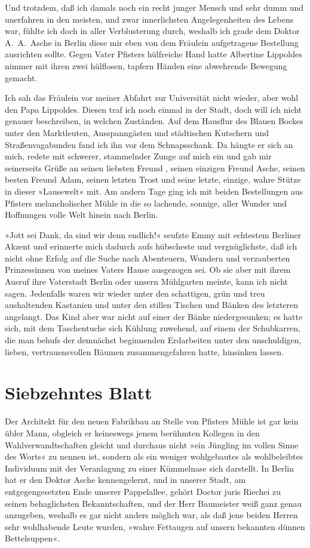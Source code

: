 Und trotzdem, daß ich damals noch ein recht junger Mensch und sehr
dumm und unerfahren in den meisten, und zwar innerlichsten
Angelegenheiten des Lebens war, fühlte ich doch in aller
Verblusterung durch, weshalb ich grade dem Doktor A.~A.~Asche in
Berlin diese mir eben von dem Fräulein aufgetragene Bestellung
ausrichten sollte. Gegen Vater Pfisters hülfreiche Hand hatte
Albertine Lippoldes nimmer mit ihren zwei hülflosen, tapfern Händen
eine abwehrende Bewegung gemacht.

Ich sah das Fräulein vor meiner Abfahrt zur Universität nicht
wieder, aber wohl den Papa Lippoldes. Diesen traf ich noch einmal
in der Stadt, doch will ich nicht genauer beschreiben, in welchen
Zuständen. Auf dem Hausflur des Blauen Bockes unter den
Marktleuten, Ausspanngästen und städtischen Kutschern und
Straßenvagabunden fand ich ihn vor dem Schnapsschank. Da hängte er
sich an mich, redete mit schwerer, stammelnder Zunge auf mich ein
und gab mir seinerseits Grüße an seinen liebsten Freund , seinen
einzigen Freund Asche, seinen besten Freund Adam, seinen letzten
Trost und seine letzte, einzige, wahre Stütze in dieser »Lausewelt«
mit. Am andern Tage ging ich mit beiden Bestellungen aus Pfisters
melancholischer Mühle in die so lachende, sonnige, aller Wunder und
Hoffnungen volle Welt hinein nach Berlin.

»Jott sei Dank, da sind wir denn endlich!« seufzte Emmy mit
echtestem Berliner Akzent und erinnerte mich dadurch aufs
hübscheste und vergnüglichste, daß ich nicht ohne Erfolg auf die
Suche nach Abenteuern, Wundern und verzauberten Prinzessinnen von
meines Vaters Hause ausgezogen sei. Ob sie aber mit ihrem Ausruf
ihre Vaterstadt Berlin oder unsern Mühlgarten meinte, kann ich
nicht sagen. Jedenfalls waren wir wieder unter den schattigen, grün
und treu aushaltenden Kastanien und unter den stillen Tischen und
Bänken des letzteren angelangt. Das Kind aber war nicht auf einer
der Bänke niedergesunken; es hatte sich, mit dem Taschentuche sich
Kühlung zuwehend, auf einem der Schubkarren, die man behufs der
demnächst beginnenden Erdarbeiten unter den unschuldigen, lieben,
vertrauensvollen Bäumen zusammengefahren hatte, hinsinken lassen.

\section{Siebzehntes Blatt}

Der Architekt für den neuen Fabrikbau an Stelle von Pfisters Mühle
ist gar kein übler Mann, obgleich er keineswegs jenem berühmten
Kollegen in den Wahlverwandtschaften gleicht und durchaus nicht
»ein Jüngling im vollen Sinne des Worts« zu nennen ist, sondern als
ein weniger wohlgebautes als wohlbeleibtes Individuum mit der
Veranlagung zu einer Kümmelnase sich darstellt. In Berlin hat er
den Doktor Asche kennengelernt, und in unserer Stadt, am
entgegengesetzten Ende unserer Pappelallee, gehört Doctor juris
Riechei zu seinen behaglichsten Bekanntschaften, und der Herr
Baumeister weiß ganz genau anzugeben, weshalb es gar nicht anders
möglich war, als daß jene beiden Herren sehr wohlhabende Leute
wurden, »wahre Fettaugen auf unsern bekannten dünnen
Bettelsuppen«.

